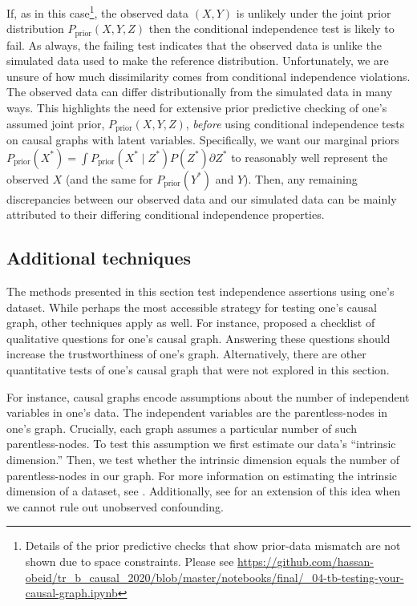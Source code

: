If, as in this case\footnote{Details of the prior predictive checks that show prior-data mismatch are not shown due to space constraints. Please see \url{https://github.com/hassan-obeid/tr_b_causal_2020/blob/master/notebooks/final/_04-tb-testing-your-causal-graph.ipynb}}, the observed data $\left( X, Y \right)$ is unlikely under the joint prior distribution $P_{\textrm{prior}} \left( X, Y, Z \right)$ then the conditional independence test is likely to fail.
As always, the failing test indicates that the observed data is unlike the simulated data used to make the reference distribution.
Unfortunately, we are unsure of how much dissimilarity comes from conditional independence violations.
The observed data can differ distributionally from the simulated data in many ways.
This highlights the need for extensive prior predictive checking of one's assumed joint prior, $P_{\textrm{prior}} \left( X, Y, Z \right)$, \textit{before} using conditional independence tests on causal graphs with latent variables.
Specifically, we want our marginal priors $P_{\textrm{prior}} \left( X^{*} \right) = \int P_{\textrm{prior}} \left( X^{*} \mid Z^{*} \right) P \left( Z^{*} \right) \partial Z^{*}$ to reasonably well represent the observed $X$ (and the same for $P_{\textrm{prior}} \left( Y^{*} \right)$ and $Y$).
Then, any remaining discrepancies between our observed data and our simulated data can be mainly attributed to their differing conditional independence properties.

\subsection{Additional techniques}
\label{sec:testing-addendum}

The methods presented in this section test independence assertions using one's dataset.
While perhaps the most accessible strategy for testing one's causal graph, other techniques apply as well.
For instance, \citet{pitchforth_2013_proposed} proposed a checklist of qualitative questions for one's causal graph.
Answering these questions should increase the trustworthiness of one's graph.
Alternatively, there are other quantitative tests of one's causal graph that were not explored in this section.

For instance, causal graphs encode assumptions about the number of independent variables in one's data.
The independent variables are the parentless-nodes in one's graph.
Crucially, each graph assumes a particular number of such parentless-nodes.
To test this assumption we first estimate our data's ``intrinsic dimension.''
Then, we test whether the intrinsic dimension equals the number of parentless-nodes in our graph.
For more information on estimating the intrinsic dimension of a dataset, see \citet{camastra_2016_intrinsic, song_2019_identification}.
Additionally, see \citet{chenwei_2019_likelihood} for an extension of this idea when we cannot rule out unobserved confounding.

